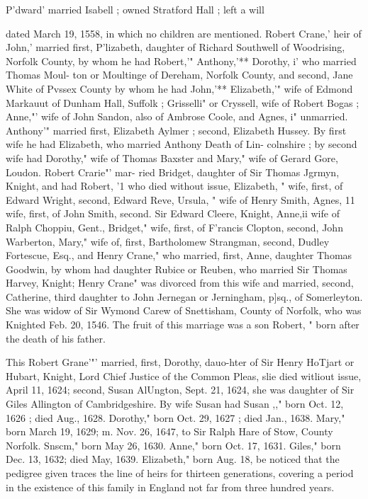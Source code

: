 \documentclass{book}
\begin{document}
P'dward' married Isabell ; owned Stratford Hall ; left a will 

dated March 19, 1558, in which no children are mentioned. 
Robert Crane,' heir of John,' married first, P'lizabeth, daughter 
of Richard Southwell of Woodrising, Norfolk County, by whom he 
had Robert,'" Anthony,'** Dorothy, i' who married Thomas Moul- 
ton or Moultinge of Dereham, Norfolk County, and second, Jane 
White of Pvssex County by whom he had John,'** Elizabeth,'" 
wife of Edmond Markauut of Dunham Hall, Suffolk ; Grisselli" 
or Cryssell, wife of Robert Bogas ; Anne,"' wife of John Sandon, 
also of Ambrose Coole, and Agnes, i" unmarried. Anthony'" 
married first, Elizabeth Aylmer ; second, Elizabeth Hussey. By 
first wife he had Elizabeth, who married Anthony Death of Lin- 
colnshire ; by second wife had Dorothy," wife of Thomas Baxster 
and Mary," wife of Gerard Gore, Loudon. Robert Crarie"' mar- 
ried Bridget, daughter of Sir Thomas Jgrmyn, Knight, and had 
Robert, '1 who died without issue, Elizabeth, " wife, first, of 
Edward Wright, second, Edward Reve, Ursula, " wife of Henry 
Smith, Agnes, 11 wife, first, of John Smith, second. Sir Edward 
Cleere, Knight, Anne,ii wife of Ralph Choppiu, Gent., Bridget," 
wife, first, of F'rancis Clopton, second, John Warberton, Mary," 
wife of, first, Bartholomew Strangman, second, Dudley Fortescue, 
Esq., and Henry Crane," who married, first, Anne, daughter 
Thomas Goodwin, by whom had daughter Rubice or Reuben, 
who married Sir Thomas Harvey, Knight; Henry Crane" was 
divorced from this wife and married, second, Catherine, third 
daughter to John Jernegan or Jerningham, p]sq., of Somerleyton. 
She was widow of Sir Wymond Carew of Snettisham, County of 
Norfolk, who was Knighted Feb. 20, 1546. The fruit of this 
marriage was a son Robert, " born after the death of his father. 




This Robert Grane'"' married, first, Dorothy, dauo-hter of Sir 
Henry HoTjart or Hubart, Knight, Lord Chief Justice of the 
Common Pleas, slie died witliout issue, April 11, 1624; second, 
Susan AlUngton, Sept. 21, 1624, she was daughter of Sir Giles 
Allington of Cambridgeshire. By wife Susan had Susan ,," born 
Oct. 12, 1626 ; died Aug., 1628. Dorothy," born Oct. 29, 1627 ; 
died Jan., 1638. Mary," born March 19, 1629; m. Nov. 26, 
1647, to Sir Ralph Hare of Stow, County Norfolk. Snscm," 
born May 26, 1630. Anne," born Oct. 17, 1631. Giles," born 
Dec. 13, 1632; died May, 1639. Elizabeth," born Aug. 18, 
be noticed that the pedigree given traces the line of heirs for 
thirteen generations, covering a period in the existence of this 
family in England not far from three hundred years. 
\end{document}
